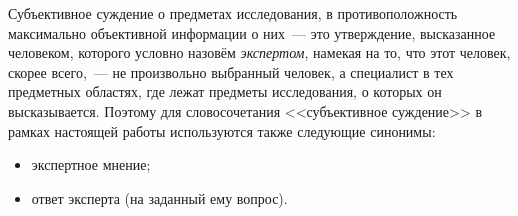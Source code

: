  \begin{comment}
 
Например, в следующих случаях применение теории вероятностей не приводит к успеху:
\begin{enumerate}
  \item Пусть вероятностная модель отдельно взятого наблюдения существует, но вероятности элементарных событий~--- не константы; они могут  подчиняться своему собственному вероятностному закону, но могут и не подчиняться. Иными словами, пусть есть серия стохастических испытаний, моделируемых вероятностными пространствами $\OAPR{1}, \OAPR{2}, \ldots$, но вероятности элементарных исходов изменяются от испытания к испытанию, причём нет информации о зависимости $\Pr_{i}$ от индекса, и суммарное вероятностное пространство выглядит так: $\OAPR{1} \times \OAPR{2} \times \ldots$. Тогда большие объёмы данных наблюдений за реализацией событий $\om \in \Om$ оказываются неполными и противоречивыми, теоретически существующую вероятностную модель наблюдений построить нельзя, и неопределённость результатов наблюдений является \todo{Она \textbf{является} стохастической, но её вероятностная модель не может быть построена эмпирически}нестохастической. 
  \item Пусть испытание с неизвестным исходом нельзя многократно повторить при фиксированных условиях: можно сделать лишь несколько измерений, в предельном случае~--- лишь одно измерение. Тогда событийно-частотных (статистических) данных о предметах исследования не хватит для эмпирического восстановления вероятностной модели, даже если последняя теоретически существует. Неопределённость реализации событий $\om \in \Om$ в единичном испытании является \todo{То же замечание: она \textbf{является} стохастической, но её вероятностная модель не может быть построена эмпирически}нестохастической. 
  \item \todo{Вот это единственный пример действительно нестохастической неопределённости}Существуют явления, где присутствует неопределённость, но для которых построение вероятностной модели в принципе не имеет смысла. Широко используемые в настоящей работе {\sl субъективные суждения}~--- одно из таких явлений. 
\end{enumerate} 

\end{comment}

Субъективное суждение о предметах исследования, в противоположность максимально объективной информации о них~--- это утверждение, высказанное человеком, которого  условно назовём {\sl экспертом}, намекая на то, что этот человек, скорее всего,~--- не произвольно выбранный человек, а специалист в тех предметных областях, где лежат предметы исследования, о которых он высказывается. Поэтому для словосочетания <<субъективное суждение>> в рамках настоящей работы используются также следующие синонимы: 
\begin{itemize}
	\item экспертное мнение;
	\item ответ эксперта (на заданный ему вопрос). 
 \end{itemize}
 
